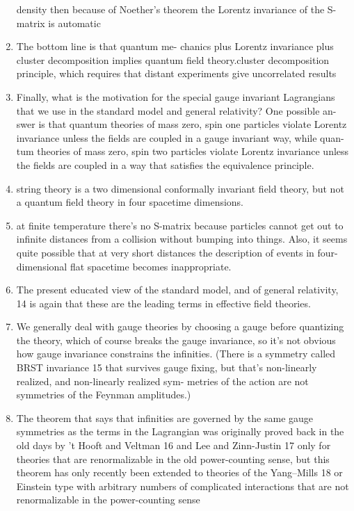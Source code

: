 \begin{enumerate}
	density then because of Noether’s theorem the Lorentz invariance of the S-
	matrix is automatic
	\item The bottom line is that quantum me-
	chanics plus Lorentz invariance plus cluster decomposition implies quantum
	field theory.cluster decomposition principle, which requires that distant experiments give
	uncorrelated results
	\item Finally, what is the motivation for the special gauge invariant Lagrangians
	that we use in the standard model and general relativity? One possible an-
	swer is that quantum theories of mass zero, spin one particles violate Lorentz
	invariance unless the fields are coupled in a gauge invariant way, while quan-
	tum theories of mass zero, spin two particles violate Lorentz invariance unless
	the fields are coupled in a way that satisfies the equivalence principle.
	\item string theory is a two dimensional conformally invariant field theory, but not a quantum
	field theory in four spacetime dimensions.
	\item  at
	finite temperature there’s no S-matrix because particles cannot get out to
	infinite distances from a collision without bumping into things. Also, it
	seems quite possible that at very short distances the description of events in
	four-dimensional flat spacetime becomes inappropriate.
	\item The present
	educated view of the standard model, and of general relativity, 14 is again that
	these are the leading terms in effective field theories.
	\item We generally deal with gauge theories
	by choosing a gauge before quantizing the theory, which of course breaks
	the gauge invariance, so it’s not obvious how gauge invariance constrains
	the infinities. (There is a symmetry called BRST invariance 15 that survives
	gauge fixing, but that’s non-linearly realized, and non-linearly realized sym-
	metries of the action are not symmetries of the Feynman amplitudes.)
	\item  The theorem
	that says that infinities are governed by the same gauge symmetries as the
	terms in the Lagrangian was originally proved back in the old days by ’t
	Hooft and Veltman 16 and Lee and Zinn-Justin 17 only for theories that are
	renormalizable in the old power-counting sense, but this theorem has only
	recently been extended to theories of the Yang–Mills 18 or Einstein type with
	arbitrary numbers of complicated interactions that are not renormalizable in
	the power-counting sense

\end{enumerate}
